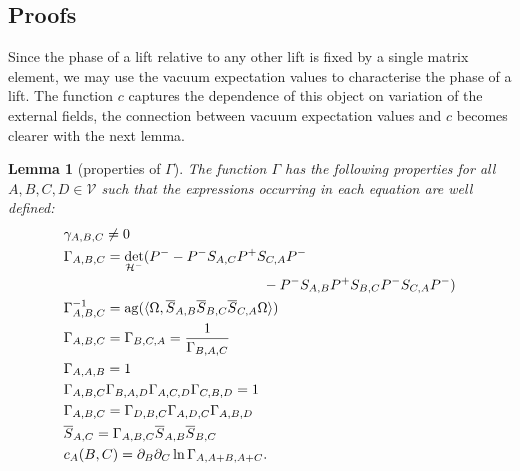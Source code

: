 \documentclass[b5paper,draft,openbib,12pt]{memoir}
\newtheorem{Lemma}[Def]{Lemma}
\DeclareMathOperator{\ag}{ag}
\begin{document}
\subsection{Proofs}


Since the phase of a lift relative to any other lift is fixed by a single matrix element, we may use the vacuum expectation values to characterise the
phase of a lift. The function \(c\) captures the dependence of this object on variation of the external fields, the connection between vacuum expectation
values and \(c\) becomes clearer with the next lemma.

\begin{Lemma}[properties of \(\Gamma\)]\label{gamma attri}
The function \(\Gamma\) has the following properties for all  \(A,B,C,D\in\mathcal{V}\) such that the expressions occurring in each equation are well defined:
\begin{align}\label{gamma attri0}
&\gamma_{A,B,C}\neq 0\\\notag
&\Gamma_{A,B,C}=\det_{\mathcal{H}^-}(P^--P^-S_{A,C}P^+S_{C,A}P^- \\\label{gamma attri1}
&\hspace{5cm}- P^- S_{A,B} P^+ S_{B,C} P^- S_{C,A} P^-)\\\label{gamma attri2}
&\Gamma_{A,B,C}^{-1}=\ag(\langle \Omega, \overline{S}_{A,B} \overline{S}_{B,C} \overline{S}_{C,A}\Omega\rangle )\\\label{gamma attri3}
&\Gamma_{A,B,C}=\Gamma_{B,C,A}=\frac{1}{\Gamma_{B,A,C}}\\\label{gamma attri4}
&\Gamma_{A,A,B}=1\\\label{gamma attri5}
&\Gamma_{A,B,C}\Gamma_{B,A,D}\Gamma_{A,C,D}\Gamma_{C,B,D}=1 \\\label{gamma attri6}
&\Gamma_{A,B,C}=\Gamma_{D,B,C}\Gamma_{A,D,C}\Gamma_{A,B,D} \\\label{gamma attri7}
&\overline{S}_{A,C}=\Gamma_{A,B,C}\overline{S}_{A,B}\overline{S}_{B,C}\\\label{gamma attri8}
&c_A(B,C)=\partial_B \partial_C \ln \Gamma_{A,A+B,A+C}.
\end{align}
\end{Lemma}
\end{document}
